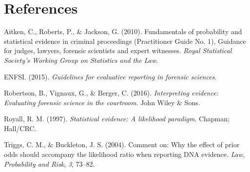 \documentclass[10pt,dvipsnames,enabledeprecatedfontcommands]{scrartcl}
\begin{document}
\section*{References}\label{references}

\hypertarget{refs}{}
\hypertarget{ref-aitken2010fundamentals}{}
Aitken, C., Roberts, P., \& Jackson, G. (2010). Fundamentals of
probability and statistical evidence in criminal proceedings
(Practitioner Guide No. 1), Guidance for judges, lawyers, forensic
scientists and expert witnesses. \emph{Royal Statistical Society's
Working Group on Statistics and the Law}.

\hypertarget{ref-enfs2015}{}
ENFSI. (2015). \emph{Guidelines for evaluative reporting in forensic
sciences}.

\hypertarget{ref-robertson2016interpreting}{}
Robertson, B., Vignaux, G., \& Berger, C. (2016). \emph{Interpreting
evidence: Evaluating forensic science in the courtroom}. John Wiley \&
Sons.

\hypertarget{ref-Royall1997}{}
Royall, R. M. (1997). \emph{Statistical evidence: A likelihood
paradigm}. Chapman; Hall/CRC.

\hypertarget{ref-triggsCommentWhyEffecta}{}
Triggs, C. M., \& Buckleton, J. S. (2004). Comment on: Why the effect of
prior odds should accompany the likelihood ratio when reporting DNA
evidence. \emph{Law, Probability and Risk}, \emph{3}, 73--82.
\end{document}
